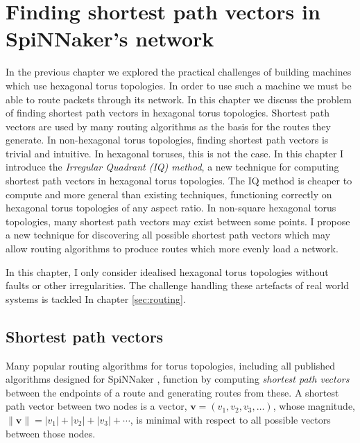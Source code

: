 \chapter{Finding shortest path vectors in SpiNNaker's network}
	
	\label{sec:shortestPaths}
	
	
	In the previous chapter we explored the practical challenges of building
	machines which use hexagonal torus topologies. In order to use such a machine
	we must be able to route packets through its network.  In this chapter we
	discuss the problem of finding shortest path vectors in hexagonal torus
	topologies. Shortest path vectors are used by many routing algorithms as the
	basis for the routes they generate. In non-hexagonal torus topologies,
	finding shortest path vectors is trivial and intuitive. In hexagonal toruses,
	this is not the case. In this chapter I introduce the \emph{Irregular
	Quadrant (IQ) method}, a new technique for computing shortest path vectors in
	hexagonal torus topologies.  The IQ method is cheaper to compute and more
	general than existing techniques, functioning correctly on hexagonal torus
	topologies of any aspect ratio. In non-square hexagonal torus topologies,
	many shortest path vectors may exist between some points. I propose a new
	technique for discovering all possible shortest path vectors which may allow
	routing algorithms to produce routes which more evenly load a network.
	
	In this chapter, I only consider idealised hexagonal torus topologies without
	faults or other irregularities. The challenge handling these artefacts of
	real world systems is tackled In chapter \ref{sec:routing}.
	
	\section{Shortest path vectors}
		
		Many popular routing algorithms for torus topologies, including all
		published algorithms designed for SpiNNaker \cite{davies12,navaridas14},
		function by computing \emph{shortest path vectors} between the endpoints of
		a route and generating routes from these. A shortest path vector between
		two nodes is a vector, $\mathbf{v} = (v_1, v_2, v_3, \ldots)$, whose
		magnitude, $\| \mathbf{v} \| = \lvert v_1 \rvert + \lvert v_2 \rvert +
		\lvert v_3 \rvert + \cdots$, is minimal with respect to all possible
		vectors between those nodes.
		

